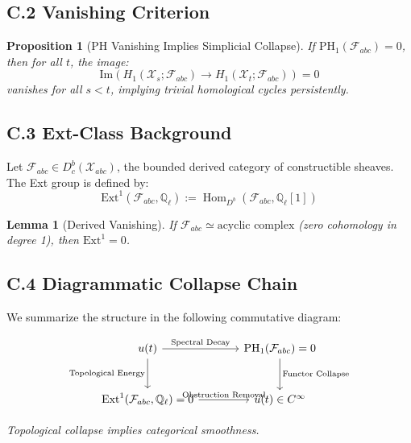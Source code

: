 \documentclass[11pt]{article}
\newtheorem{lemma}[theorem]{Lemma}
\newtheorem{proposition}[theorem]{Proposition}
\begin{document}
\subsection*{C.2 Vanishing Criterion}

\begin{proposition}[PH Vanishing Implies Simplicial Collapse]
If \( \mathrm{PH}_1(\mathcal{F}_{abc}) = 0 \), then for all \( t \), the image:
\[
\mathrm{Im} \left( H_1(\mathcal{X}_s; \mathcal{F}_{abc}) \to H_1(\mathcal{X}_t; \mathcal{F}_{abc}) \right) = 0
\]
vanishes for all \( s < t \), implying trivial homological cycles persistently.
\end{proposition}

\subsection*{C.3 Ext-Class Background}

Let \( \mathcal{F}_{abc} \in D^b_c(\mathcal{X}_{abc}) \), the bounded derived category of constructible sheaves.  
The Ext group is defined by:
\[
\mathrm{Ext}^1(\mathcal{F}_{abc}, \mathbb{Q}_\ell) := \operatorname{Hom}_{D^b}(\mathcal{F}_{abc}, \mathbb{Q}_\ell[1])
\]

\begin{lemma}[Derived Vanishing]
If \( \mathcal{F}_{abc} \simeq \text{acyclic complex} \) (zero cohomology in degree 1), then \( \mathrm{Ext}^1 = 0 \).
\end{lemma}

\subsection*{C.4 Diagrammatic Collapse Chain}

We summarize the structure in the following commutative diagram:

\[
\begin{tikzcd}[row sep=large, column sep=large]
u(t) \arrow[r, "\text{Spectral Decay}"] \arrow[d, swap, "\text{Topological Energy}"]
& \mathrm{PH}_1(\mathcal{F}_{abc}) = 0 \arrow[d, "\text{Functor Collapse}"] \\
\mathrm{Ext}^1(\mathcal{F}_{abc}, \mathbb{Q}_\ell) = 0 \arrow[r, "\text{Obstruction Removal}"]
& u(t) \in C^\infty
\end{tikzcd}
\]

\begin{center}
    \textit{Topological collapse implies categorical smoothness.}
\end{center}
\end{document}
